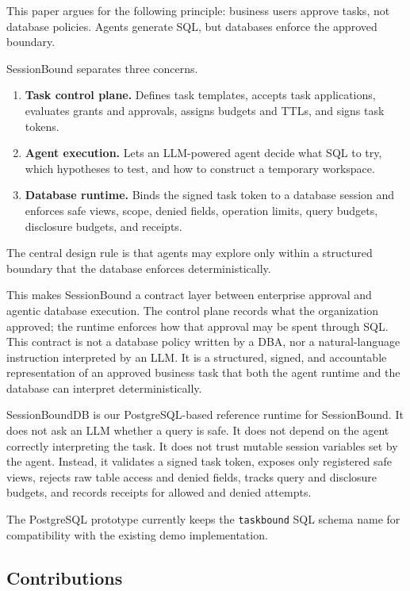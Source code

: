 \documentclass[
]{article}
\providecommand{\tightlist}{%
  \setlength{\itemsep}{0pt}\setlength{\parskip}{0pt}}
\begin{document}
This paper argues for the following principle: business users approve
tasks, not database policies. Agents generate SQL, but databases enforce
the approved boundary.

SessionBound separates three concerns.

\begin{enumerate}
\def\labelenumi{\arabic{enumi}.}
\tightlist
\item
  \textbf{Task control plane.} Defines task templates, accepts task
  applications, evaluates grants and approvals, assigns budgets and
  TTLs, and signs task tokens.
\item
  \textbf{Agent execution.} Lets an LLM-powered agent decide what SQL to
  try, which hypotheses to test, and how to construct a temporary
  workspace.
\item
  \textbf{Database runtime.} Binds the signed task token to a database
  session and enforces safe views, scope, denied fields, operation
  limits, query budgets, disclosure budgets, and receipts.
\end{enumerate}

The central design rule is that agents may explore only within a
structured boundary that the database enforces deterministically.

This makes SessionBound a contract layer between enterprise approval and
agentic database execution. The control plane records what the
organization approved; the runtime enforces how that approval may be
spent through SQL. This contract is not a database policy written by a
DBA, nor a natural-language instruction interpreted by an LLM. It is a
structured, signed, and accountable representation of an approved
business task that both the agent runtime and the database can interpret
deterministically.

SessionBoundDB is our PostgreSQL-based reference runtime for
SessionBound. It does not ask an LLM whether a query is safe. It does
not depend on the agent correctly interpreting the task. It does not
trust mutable session variables set by the agent. Instead, it validates
a signed task token, exposes only registered safe views, rejects raw
table access and denied fields, tracks query and disclosure budgets, and
records receipts for allowed and denied attempts.

The PostgreSQL prototype currently keeps the \texttt{taskbound} SQL
schema name for compatibility with the existing demo implementation.

\hypertarget{contributions}{%
\subsection{Contributions}\label{contributions}}
\end{document}
